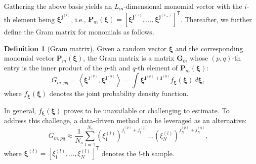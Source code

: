 \documentclass[journal]{IEEEtran}
\theoremstyle{definition}
\newtheorem{definition}{Definition}
\theoremstyle{remark}
\begin{document}
Gathering the above basis yields an \textcolor{black}{$L_{m}$}-dimensional monomial vector with the $i$-th element being $\boldsymbol{\xi}^{\boldsymbol{j}^{(i)}}$, i.e., $\boldsymbol{P}_m(\boldsymbol{\xi})=[\boldsymbol{\xi}^{\boldsymbol{j}^{(1)}},\dots,\boldsymbol{\xi}^{\boldsymbol{j}^{(L_{m})}}]^{\mathsf{T}}$. Thereafter, we further define the Gram matrix for monomials as follows.
\begin{definition}[Gram matrix]\label{def:1}
Given a random vector $\boldsymbol{\xi}$ and the corresponding monomial vector $\boldsymbol{P}_m(\boldsymbol{\xi})$, the Gram matrix is a matrix $\boldsymbol{G}_{m}$ whose $(p,q)$-th entry is the inner product of the $p$-th and $q$-th element of $\boldsymbol{P}_m(\boldsymbol{\xi})$:
\begin{equation}
    G_{m,pq}=\left\langle \boldsymbol{\xi}^{\boldsymbol{j}^{(p)}}, \boldsymbol{\xi}^{\boldsymbol{j}^{(q)}} \right\rangle=\int \boldsymbol{\xi}^{\boldsymbol{j}^{(p)}+\boldsymbol{j}^{(q)}}f_{\boldsymbol{\xi}}(\boldsymbol{\xi}) \, d\boldsymbol{\xi},
\end{equation}
where $f_{\boldsymbol{\xi}}(\boldsymbol{\xi})$ denotes the joint probability density function.
\end{definition}
In general, $f_{\boldsymbol{\xi}}(\boldsymbol{\xi})$ proves to be unavailable or challenging to estimate. To address this challenge, a data-driven method can be leveraged as an alternative:
\begin{equation}\label{eq:12}
    G_{m,pq}\approx\frac{1}{N_s}\sum\limits_{l=1}^{N_s}(\xi_1^{(l)})^{j_1^{(p)}+j_1^{(q)}}\dots(\xi_N^{(l)})^{j_N^{(p)}+j_N^{(q)}},
\end{equation}
where $\boldsymbol{\xi}^{(l)}=[\xi_1^{(l)},\dots,\xi_N^{(l)}]^{\mathsf{T}}$ denotes the $l$-th sample.
\end{document}
